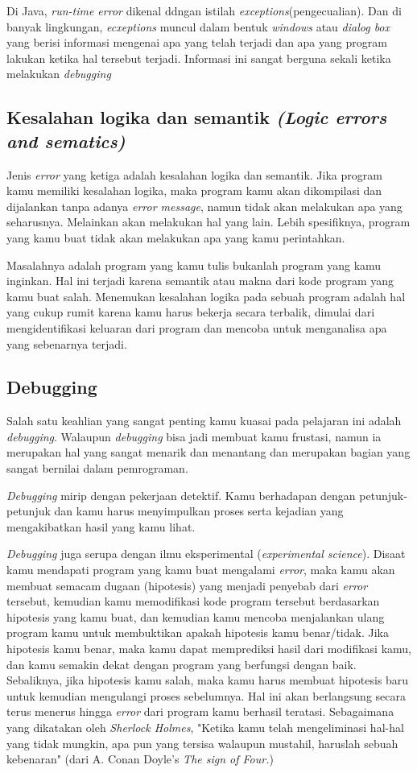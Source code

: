 Di Java, \textit{run-time error} dikenal ddngan istilah \textit{exceptions}(pengecualian). Dan di banyak lingkungan, \textit{ecxeptions} muncul dalam bentuk \textit{windows} atau \textit{dialog box} yang berisi informasi mengenai apa yang telah terjadi dan apa yang program lakukan ketika hal tersebut terjadi. Informasi ini sangat berguna sekali ketika melakukan \textit{debugging}
\subsection{Kesalahan logika dan semantik \textit{(Logic errors and sematics)}} 
Jenis \textit{error} yang ketiga adalah kesalahan logika dan semantik. Jika program kamu memiliki kesalahan logika, maka program kamu akan dikompilasi dan dijalankan tanpa adanya \textit{error message}, namun tidak akan melakukan apa yang seharusnya. Melainkan akan melakukan hal yang lain. Lebih spesifiknya, program yang kamu buat tidak akan melakukan apa yang kamu perintahkan.

Masalahnya adalah program yang kamu tulis bukanlah program yang kamu inginkan. Hal ini terjadi karena semantik atau makna dari kode program yang kamu buat salah. Menemukan kesalahan logika pada sebuah program adalah hal yang cukup rumit karena kamu harus bekerja secara terbalik, dimulai dari mengidentifikasi keluaran dari program dan mencoba untuk menganalisa apa yang sebenarnya terjadi.

\subsection{Debugging}
Salah satu keahlian yang sangat penting kamu kuasai pada pelajaran ini adalah \textit{debugging}. Walaupun \textit{debugging} bisa jadi membuat kamu frustasi, namun ia merupakan hal yang sangat menarik dan menantang dan merupakan bagian yang sangat bernilai dalam pemrograman.

\textit{Debugging} mirip dengan pekerjaan detektif. Kamu berhadapan dengan petunjuk-petunjuk dan kamu harus menyimpulkan proses serta kejadian yang mengakibatkan hasil yang kamu lihat.

\textit{Debugging} juga serupa dengan ilmu eksperimental (\textit{experimental science}). Disaat kamu mendapati program yang kamu buat mengalami \textit{error}, maka kamu akan membuat semacam dugaan (hipotesis) yang menjadi penyebab dari \textit{error} tersebut, kemudian kamu memodifikasi kode program tersebut berdasarkan hipotesis yang kamu buat, dan kemudian kamu mencoba menjalankan ulang program kamu untuk membuktikan apakah hipotesis kamu benar/tidak. Jika hipotesis kamu benar, maka kamu dapat memprediksi hasil dari modifikasi kamu, dan kamu semakin dekat dengan program yang berfungsi dengan baik. Sebaliknya, jika hipotesis kamu salah, maka kamu harus membuat hipotesis baru untuk kemudian mengulangi proses sebelumnya. Hal ini akan berlangsung secara terus menerus hingga \textit{error} dari program kamu berhasil teratasi. Sebagaimana yang dikatakan oleh \textit{Sherlock Holmes}, "Ketika kamu telah mengeliminasi hal-hal yang tidak mungkin, apa pun yang tersisa walaupun mustahil, haruslah sebuah kebenaran" (dari A. Conan Doyle's \textit{The sign of Four.})

